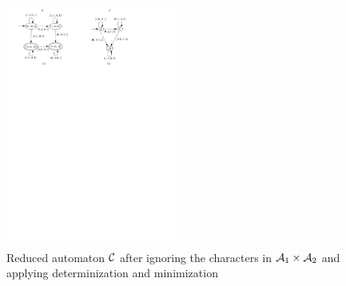 \begin{figure}[ht]
  \centering
  \includegraphics[width = 0.5\textwidth]{sections/overview-cefa-reduced.pdf}
  \caption{Reduced automaton $\mathcal{C}$ after ignoring the characters in $\mathcal{A}_1 \times \mathcal{A}_2$ and applying determinization and minimization}
  \label{fig:overview:product:reduced}
\end{figure}



